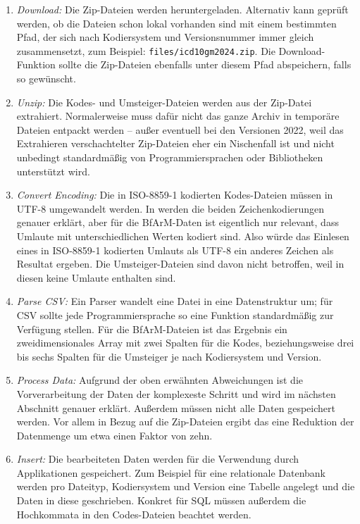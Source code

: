 \begin{enumerate}
\item \emph{Download:} Die Zip-Dateien werden heruntergeladen. Alternativ kann geprüft werden, ob die Dateien schon lokal vorhanden sind mit einem bestimmten Pfad, der sich nach Kodiersystem und Versionsnummer immer gleich zusammensetzt, zum Beispiel: \texttt{files/icd10gm2024.zip}. Die Download-Funktion sollte die Zip-Dateien ebenfalls unter diesem Pfad abspeichern, falls so gewünscht.
\item \emph{Unzip:} Die Kodes- und Umsteiger-Dateien werden aus der Zip-Datei extrahiert. Normalerweise muss dafür nicht das ganze Archiv in temporäre Dateien entpackt werden -- außer eventuell bei den Versionen 2022, weil das Extrahieren verschachtelter Zip-Dateien eher ein Nischenfall ist und nicht unbedingt standardmäßig von Programmiersprachen oder Bibliotheken unterstützt wird. 
\item \emph{Convert Encoding:}\label{latin1-encoding} Die in ISO-8859-1 kodierten Kodes-Dateien müssen in UTF-8 umgewandelt werden. In \citep{charencoding} werden die beiden Zeichenkodierungen genauer erklärt, aber für die BfArM-Daten ist eigentlich nur relevant, dass Umlaute mit unterschiedlichen Werten kodiert sind. Also würde das Einlesen eines in ISO-8859-1 kodierten Umlauts als UTF-8 ein anderes Zeichen als Resultat ergeben. Die Umsteiger-Dateien sind davon nicht betroffen, weil in diesen keine Umlaute enthalten sind. 
\item \emph{Parse CSV:} Ein Parser wandelt eine Datei in eine Datenstruktur um; für CSV sollte jede Programmiersprache so eine Funktion standardmäßig zur Verfügung stellen. Für die BfArM-Dateien ist das Ergebnis ein zweidimensionales Array mit zwei Spalten für die Kodes, beziehungsweise drei bis sechs Spalten für die Umsteiger je nach Kodiersystem und Version. 
\item \emph{Process Data:} Aufgrund der oben erwähnten Abweichungen ist die Vorverarbeitung der Daten der komplexeste Schritt und wird im nächsten Abschnitt genauer erklärt. Außerdem müssen nicht alle Daten gespeichert werden. Vor allem in Bezug auf die Zip-Dateien ergibt das eine Reduktion der Datenmenge um etwa einen Faktor von zehn. 
\item \emph{Insert:} Die bearbeiteten Daten werden für die Verwendung durch Applikationen gespeichert. Zum Beispiel für eine relationale Datenbank werden pro Dateityp, Kodiersystem und Version eine Tabelle angelegt und die Daten in diese geschrieben. Konkret für SQL müssen außerdem die Hochkommata in den Codes-Dateien beachtet werden. 
\end{enumerate}

